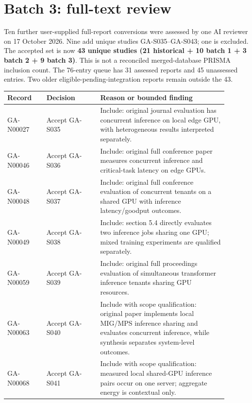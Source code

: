 \section{Batch 3: full-text review}\label{sec:batch3}

Ten further user-supplied full-report conversions were assessed by one AI reviewer on 17 October 2026. Nine add unique studies GA-S035--GA-S043; one is excluded. The accepted set is now \textbf{43 unique studies (21 historical + 10 batch 1 + 3 batch 2 + 9 batch 3)}. This is not a reconciled merged-database PRISMA inclusion count. The 76-entry queue has 31 assessed reports and 45 unassessed entries. Two older eligible-pending-integration reports remain outside the 43.

\begin{longtable}{P{0.16\linewidth}P{0.22\linewidth}P{0.52\linewidth}}\toprule Record & Decision & Reason or bounded finding\\\midrule\endhead

GA-N00027 & Accept GA-S035 \cite{edge_sky} & Include: original journal evaluation has concurrent inference on local edge GPU, with heterogeneous results interpreted separately.\\

GA-N00046 & Accept GA-S036 \cite{miriam} & Include: original full conference paper measures concurrent inference and critical-task latency on edge GPUs.\\

GA-N00048 & Accept GA-S037 \cite{elasticroom} & Include: original full conference evaluation of concurrent tenants on a shared GPU with inference latency/goodput outcomes.\\

GA-N00049 & Accept GA-S038 \cite{switchflow} & Include: section 5.4 directly evaluates two inference jobs sharing one GPU; mixed training experiments are qualified separately.\\

GA-N00059 & Accept GA-S039 \cite{itif} & Include: original full proceedings evaluation of simultaneous transformer inference tenants sharing GPU resources.\\

GA-N00063 & Accept GA-S040 \cite{protean} & Include with scope qualification: original paper implements local MIG/MPS inference sharing and evaluates concurrent inference, while synthesis separates system-level outcomes.\\

GA-N00068 & Accept GA-S041 \cite{wattwiser} & Include with scope qualification: measured local shared-GPU inference pairs occur on one server; aggregate energy is contextual only.\\


\end{longtable}
